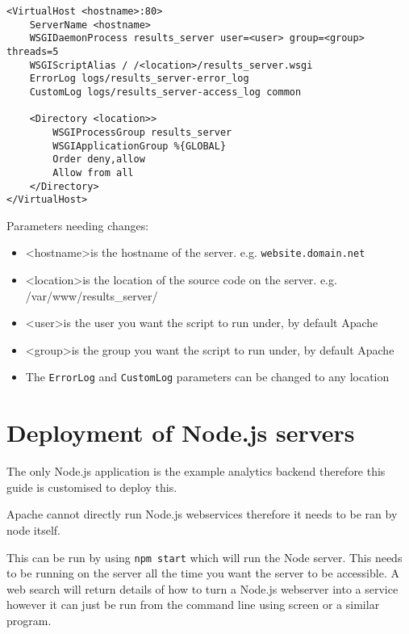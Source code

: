 \begin{lstlisting}[caption={Apache configuration}, label={code:apacheConfig_flask}]
<VirtualHost <hostname>:80>
	ServerName <hostname>
	WSGIDaemonProcess results_server user=<user> group=<group> threads=5
	WSGIScriptAlias / /<location>/results_server.wsgi
	ErrorLog logs/results_server-error_log
	CustomLog logs/results_server-access_log common

	<Directory <location>>
		WSGIProcessGroup results_server
		WSGIApplicationGroup %{GLOBAL}
		Order deny,allow
		Allow from all
	</Directory>
</VirtualHost>
\end{lstlisting}

Parameters needing changes:

\begin{itemize}
\item \textless hostname\textgreater is the hostname of the server. e.g. \lstinline|website.domain.net|
\item \textless location\textgreater is the location of the source code on the server. e.g. /var/www/results\_server/
\item \textless user\textgreater is the user you want the script to run under, by default Apache
\item \textless group\textgreater is the group you want the script to run under, by default Apache
\item The \lstinline|ErrorLog| and \lstinline|CustomLog| parameters can be changed to any location

\end{itemize}

\section{Deployment of Node.js servers} \label{Section:Deployment of Node.js servers}

The only Node.js application is the example analytics backend therefore this guide is customised to deploy this.

Apache cannot directly run Node.js webservices therefore it needs to be ran by node itself.

This can be run by using \lstinline|npm start| which will run the Node server. This needs to be running on the server all the time you want the server to be accessible.
A web search will return details of how to turn a Node.js webserver into a service however it can just be run from the command line using screen or a similar program.

